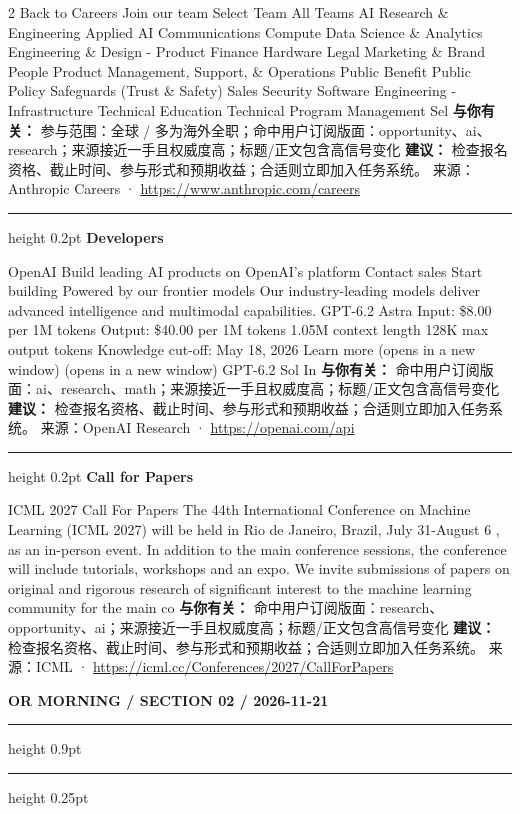 \documentclass[10.5pt]{ctexart}
\begin{document}
\begin{multicols}{2}
Back to Careers Join our team Select Team All Teams AI Research \& Engineering Applied AI Communications Compute Data Science \& Analytics Engineering \& Design - Product Finance Hardware Legal Marketing \& Brand People Product Management, Support, \& Operations Public Benefit Public Policy Safeguards (Trust \& Safety) Sales Security Software Engineering - Infrastructure Technical Education Technical Program Management Sel
\textbf{与你有关：} 参与范围：全球 / 多为海外全职；命中用户订阅版面：opportunity、ai、research；来源接近一手且权威度高；标题/正文包含高信号变化
\textbf{建议：} 检查报名资格、截止时间、参与形式和预期收益；合适则立即加入任务系统。
{\footnotesize\color{ormuted} 来源：Anthropic Careers · \url{https://www.anthropic.com/careers}}
\vspace{2mm}
\hrule height 0.2pt
\vspace{2mm}
{\large\bfseries Developers}\par
OpenAI Build leading AI products on OpenAI’s platform Contact sales Start building Powered by our frontier models Our industry-leading models deliver advanced intelligence and multimodal capabilities. GPT-6.2 Astra Input: \$8.00 per 1M tokens Output: \$40.00 per 1M tokens 1.05M context length 128K max output tokens Knowledge cut-off: May 18, 2026 Learn more (opens in a new window) (opens in a new window) GPT-6.2 Sol In
\textbf{与你有关：} 命中用户订阅版面：ai、research、math；来源接近一手且权威度高；标题/正文包含高信号变化
\textbf{建议：} 检查报名资格、截止时间、参与形式和预期收益；合适则立即加入任务系统。
{\footnotesize\color{ormuted} 来源：OpenAI Research · \url{https://openai.com/api}}
\vspace{2mm}
\hrule height 0.2pt
\vspace{2mm}
{\large\bfseries Call for Papers}\par
ICML 2027 Call For Papers The 44th International Conference on Machine Learning (ICML 2027) will be held in Rio de Janeiro, Brazil, July 31-August 6 , as an in-person event. In addition to the main conference sessions, the conference will include tutorials, workshops and an expo. We invite submissions of papers on original and rigorous research of significant interest to the machine learning community for the main co
\textbf{与你有关：} 命中用户订阅版面：research、opportunity、ai；来源接近一手且权威度高；标题/正文包含高信号变化
\textbf{建议：} 检查报名资格、截止时间、参与形式和预期收益；合适则立即加入任务系统。
{\footnotesize\color{ormuted} 来源：ICML · \url{https://icml.cc/Conferences/2027/CallForPapers}}
\end{multicols}
\newpage
{\small\bfseries OR MORNING / SECTION 02 / 2026-11-21}
\vspace{2mm}
\hrule height 0.9pt
\vspace{1.5mm}
\hrule height 0.25pt
\vspace{4mm}
\end{document}
